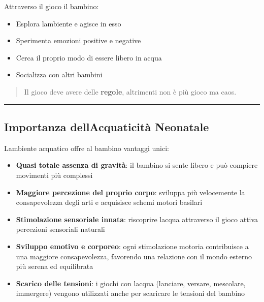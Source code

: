 \documentclass[a4paper,11pt]{article}
\providecommand{\tightlist}{%
  \setlength{\itemsep}{0pt}\setlength{\parskip}{0pt}}
\begin{document}
Attraverso il gioco il bambino:

\begin{itemize}
      \tightlist
      \item
            Esplora l\textquotesingle ambiente e agisce in esso
      \item
            Sperimenta emozioni positive e negative
      \item
            Cerca il proprio modo di essere libero in acqua
      \item
            Socializza con altri bambini
\end{itemize}

\begin{quote}
      Il gioco deve avere delle \textbf{regole}, altrimenti non è più gioco ma
      caos.
\end{quote}

\begin{center}\rule{0.5\linewidth}{0.5pt}\end{center}

\subsection{Importanza dell\textquotesingle Acquaticità
      Neonatale}\label{importanza-dellacquaticituxe0-neonatale}

L\textquotesingle ambiente acquatico offre al bambino vantaggi unici:

\begin{itemize}
      \tightlist
      \item
            \textbf{Quasi totale assenza di gravità}: il bambino si sente libero e
            può compiere movimenti più complessi
      \item
            \textbf{Maggiore percezione del proprio corpo}: sviluppa più
            velocemente la consapevolezza degli arti e acquisisce schemi motori
            basilari
      \item
            \textbf{Stimolazione sensoriale innata}: riscoprire
            l\textquotesingle acqua attraverso il gioco attiva percezioni
            sensoriali naturali
      \item
            \textbf{Sviluppo emotivo e corporeo}: ogni stimolazione motoria
            contribuisce a una maggiore consapevolezza, favorendo una relazione
            con il mondo esterno più serena ed equilibrata
      \item
            \textbf{Scarico delle tensioni}: i giochi con l\textquotesingle acqua
            (lanciare, versare, mescolare, immergere) vengono utilizzati anche per
            scaricare le tensioni del bambino
\end{itemize}
\end{document}
